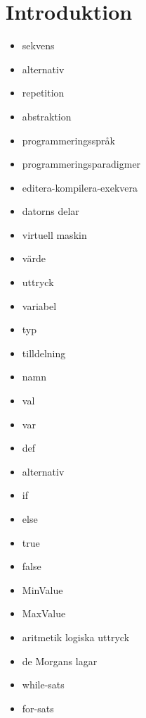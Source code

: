 \chapter{Introduktion}
\begin{itemize}[nosep]
\item sekvens
\item alternativ
\item repetition
\item abstraktion
\item programmeringsspråk
\item programmeringsparadigmer
\item editera-kompilera-exekvera
\item datorns delar
\item virtuell maskin
\item värde
\item uttryck
\item variabel
\item typ
\item tilldelning
\item namn
\item val
\item var
\item def
\item alternativ
\item if
\item else
\item true
\item false
\item MinValue
\item MaxValue
\item aritmetik logiska uttryck
\item de Morgans lagar
\item while-sats
\item for-sats
\end{itemize}